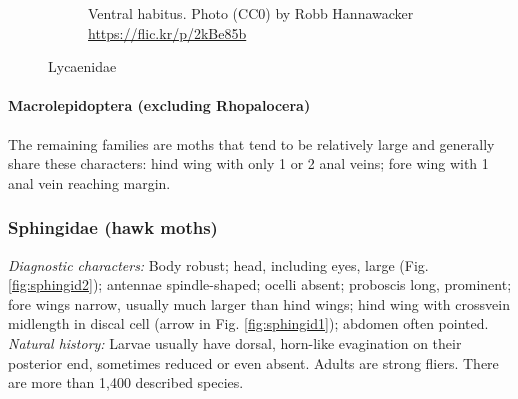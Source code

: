 \documentclass[letterpaper, 11pt]{article}
\begin{document}
\begin{figure}[ht!]
\begin{subfigure}[ht!]{0.53\textwidth}
        \caption{Ventral habitus. Photo (CC0) by Robb Hannawacker \url{https://flic.kr/p/2kBe85b}}
        \label{fig:lycaenid2}
    \end{subfigure}
    \caption{Lycaenidae}\label{fig:lycaenids}
\end{figure}

\FloatBarrier
\paragraph{Macrolepidoptera (excluding Rhopalocera)} The remaining families are moths that tend to be relatively large and generally share these characters: hind wing with only 1 or 2 anal veins; fore wing with 1 anal vein reaching margin.\\

\subsubsection{Sphingidae (hawk moths)}
\noindent{}\textit{Diagnostic characters:} Body robust; head, including eyes, large (Fig. \ref{fig:sphingid2}); antennae spindle-shaped; ocelli absent; proboscis long, prominent; fore wings narrow, usually much larger than hind wings; hind wing with crossvein midlength in discal cell (arrow in Fig. \ref{fig:sphingid1}); abdomen often pointed.\\

\noindent{}\textit{Natural history:} Larvae usually have dorsal, horn-like evagination on their posterior end, sometimes reduced or even absent. Adults are strong fliers. There are more than 1,400 described species.
\end{document}
